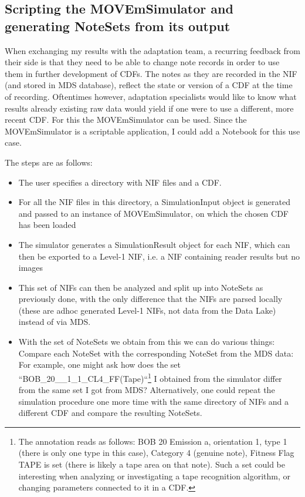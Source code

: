 \subsection{Scripting the MOVEmSimulator and generating NoteSets from its output}
When exchanging my results with the adaptation team, a recurring feedback from their side is that they need to be able to change note records in order to use them in further development of CDFs. The notes as they are recorded in the NIF (and stored in MDS database), reflect the state or version of a CDF at the time of recording. Oftentimes however, adaptation specialists would like to know what results already existing raw data would yield if one were to use a different, more recent CDF. For this the MOVEmSimulator can be used. Since the MOVEmSimulator is a scriptable application, I could add a Notebook for this use case.\par
The steps are as follows:
\begin{itemize}
\item The user specifies a directory with NIF files and a CDF.
\item For all the NIF files in this directory, a SimulationInput object is generated and passed to an instance of MOVEmSimulator, on which the chosen CDF has been loaded
\item The simulator generates a SimulationResult object for each NIF, which can then be exported to a Level-1 NIF, i.e. a NIF containing reader results but no images
\item This set of NIFs can then be analyzed and split up into NoteSets as previously done, with the only difference that the NIFs are parsed locally (these are adhoc generated Level-1 NIFs, not data from the Data Lake) instead of via MDS.
\item With the set of NoteSets we obtain from this we can do various things: Compare each NoteSet with the corresponding NoteSet from the MDS data: For example, one might ask how does the set ``BOB\_20\_\_1\_1\_CL4\_FF(Tape)``\footnote{The annotation reads as follows: BOB 20 Emission a, orientation 1, type 1 (there is only one type in this case), Category 4 (genuine note), Fitness Flag TAPE is set (there is likely a tape area on that note). Such a set could be interesting when analyzing or investigating a tape recognition algorithm, or changing parameters connected to it in a CDF.} I obtained from the simulator differ from the same set I got from MDS? Alternatively, one could repeat the simulation procedure one more time with the same directory of NIFs and a different CDF and compare the resulting NoteSets.
\end{itemize}
